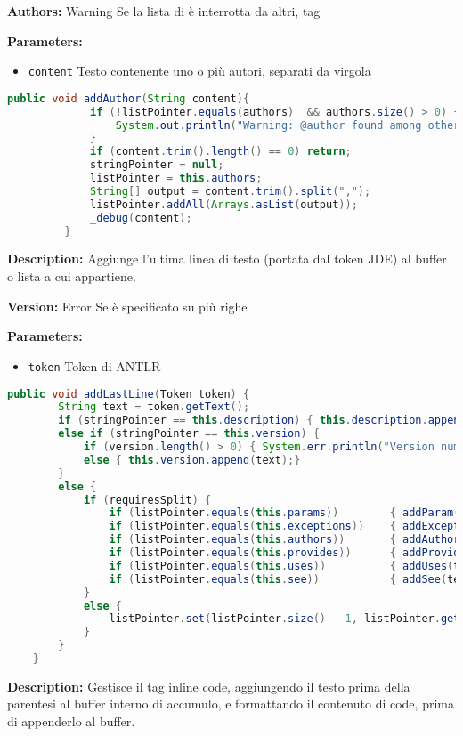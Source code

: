 \textbf{Authors:} Warning Se la lista di è interrotta da altri, tag

\textbf{Parameters:}
\begin{itemize}
  \item\texttt{content} Testo contenente uno o più autori, separati da virgola  
\end{itemize}

\begin{lstlisting}[language=Java]
         public void addAuthor(String content){
             if (!listPointer.equals(authors)  && authors.size() > 0) {
                 System.out.println("Warning: @author found among other Javadoc keywords. You should put all authors together.");
             }
             if (content.trim().length() == 0) return;
             stringPointer = null;
             listPointer = this.authors;
             String[] output = content.trim().split(",");
             listPointer.addAll(Arrays.asList(output));
             _debug(content);
         }
\end{lstlisting}
\textbf{Description:}  Aggiunge l'ultima linea di testo (portata dal token JDE) al buffer o lista a cui appartiene. 

\textbf{Version:} Error Se è specificato su più righe

\textbf{Parameters:}
\begin{itemize}
  \item\texttt{token} Token di ANTLR  
\end{itemize}

\begin{lstlisting}[language=Java]
    public void addLastLine(Token token) {
        String text = token.getText();
        if (stringPointer == this.description) { this.description.append(text); }
        else if (stringPointer == this.version) {
            if (version.length() > 0) { System.err.println("Version number must be specified on a single line at line " + token.getLine()); }
            else { this.version.append(text);}
        }
        else {
            if (requiresSplit) {
                if (listPointer.equals(this.params))        { addParam(text); }
                if (listPointer.equals(this.exceptions))    { addException(text); }
                if (listPointer.equals(this.authors))       { addAuthor(text); }
                if (listPointer.equals(this.provides))      { addProvides(text); }
                if (listPointer.equals(this.uses))          { addUses(text); }
                if (listPointer.equals(this.see))           { addSee(text); }
            }
            else {
                listPointer.set(listPointer.size() - 1, listPointer.get(listPointer.size() - 1).concat(" " + text));
            }
        }
    }
\end{lstlisting}
\textbf{Description:}  Gestisce il tag inline \atsign code, aggiungendo il testo prima della parentesi al buffer interno di accumulo, e formattando il contenuto di \atsign code, prima di appenderlo al buffer.  

